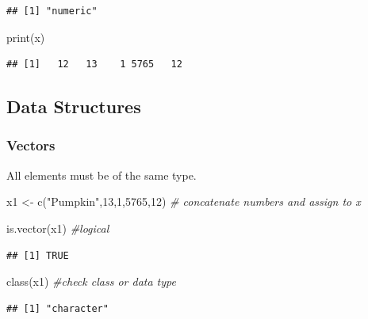 \documentclass[
]{article}
\newenvironment{Shaded}{\begin{snugshade}}{\end{snugshade}}
\newcommand{\CommentTok}[1]{\textcolor[rgb]{0.56,0.35,0.01}{\textit{#1}}}
\newcommand{\DecValTok}[1]{\textcolor[rgb]{0.00,0.00,0.81}{#1}}
\newcommand{\FunctionTok}[1]{\textcolor[rgb]{0.00,0.00,0.00}{#1}}
\newcommand{\NormalTok}[1]{#1}
\newcommand{\OtherTok}[1]{\textcolor[rgb]{0.56,0.35,0.01}{#1}}
\newcommand{\StringTok}[1]{\textcolor[rgb]{0.31,0.60,0.02}{#1}}
\begin{document}
\begin{verbatim}
## [1] "numeric"
\end{verbatim}

\begin{Shaded}
\begin{Highlighting}[]
\FunctionTok{print}\NormalTok{(x)}
\end{Highlighting}
\end{Shaded}

\begin{verbatim}
## [1]   12   13    1 5765   12
\end{verbatim}

\hypertarget{data-structures-1}{%
\subsection{Data Structures}\label{data-structures-1}}

\hypertarget{vectors-1}{%
\subsubsection{Vectors}\label{vectors-1}}

All elements must be of the same type.

\begin{Shaded}
\begin{Highlighting}[]
\NormalTok{x1 }\OtherTok{\textless{}{-}} \FunctionTok{c}\NormalTok{(}\StringTok{"Pumpkin"}\NormalTok{,}\DecValTok{13}\NormalTok{,}\DecValTok{1}\NormalTok{,}\DecValTok{5765}\NormalTok{,}\DecValTok{12}\NormalTok{) }\CommentTok{\# concatenate numbers and assign to x}

\FunctionTok{is.vector}\NormalTok{(x1) }\CommentTok{\#logical}
\end{Highlighting}
\end{Shaded}

\begin{verbatim}
## [1] TRUE
\end{verbatim}

\begin{Shaded}
\begin{Highlighting}[]
\FunctionTok{class}\NormalTok{(x1) }\CommentTok{\#check class or data type}
\end{Highlighting}
\end{Shaded}

\begin{verbatim}
## [1] "character"
\end{verbatim}
\end{document}
